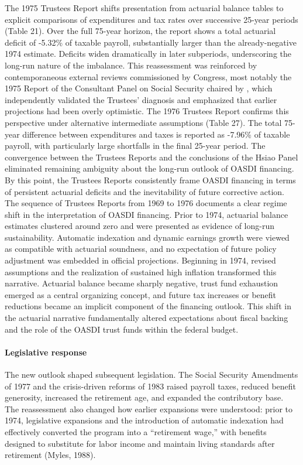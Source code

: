 \documentclass[12pt]{article}%
\theoremstyle{remark}
\begin{document}
The 1975 Trustees Report shifts presentation from actuarial balance tables to explicit comparisons of expenditures and tax rates over successive 25-year periods (Table 21). Over the full 75-year horizon, the report shows a total actuarial deficit of -5.32\% of taxable payroll, substantially larger than the already-negative 1974 estimate. Deficits widen dramatically in later subperiods, underscoring the long-run nature of the imbalance. This reassessment was reinforced by contemporaneous external reviews commissioned by Congress, most notably the 1975 Report of the Consultant Panel on Social Security chaired by \cite{Hsiao1975Report}, which independently validated the Trustees’ diagnosis and emphasized that earlier projections had been overly optimistic.
The 1976 Trustees Report confirms this perspective under alternative intermediate assumptions (Table 27). The total 75-year difference between expenditures and taxes is reported as -7.96\% of taxable payroll, with particularly large shortfalls in the final 25-year period. The convergence between the Trustees Reports and the conclusions of the Hsiao Panel eliminated remaining ambiguity about the long-run outlook of OASDI financing. By this point, the Trustees Reports consistently frame OASDI financing in terms of persistent actuarial deficits and the inevitability of future corrective action.
The sequence of Trustees Reports from 1969 to 1976 documents a clear regime shift in the interpretation of OASDI financing. Prior to 1974, actuarial balance estimates clustered around zero and were presented as evidence of long-run sustainability. Automatic indexation and dynamic earnings growth were viewed as compatible with actuarial soundness, and no expectation of future policy adjustment was embedded in official projections.
Beginning in 1974, revised assumptions and the realization of sustained high inflation transformed this narrative. Actuarial balance became sharply negative, trust fund exhaustion emerged as a central organizing concept, and future tax increases or benefit reductions became an implicit component of the financing outlook. This shift in the actuarial narrative fundamentally altered expectations about fiscal backing and the role of the OASDI trust funds within the federal budget.
\paragraph{Legislative response}
The new outlook shaped subsequent legislation. The Social Security Amendments of 1977 and the crisis-driven reforms of 1983 raised payroll taxes, reduced benefit generosity, increased the retirement age, and expanded the contributory base. The reassessment also changed how earlier expansions were understood: prior to 1974, legislative expansions and the introduction of automatic indexation had effectively converted the program into a “retirement wage,” with benefits designed to substitute for labor income and maintain living standards after retirement (Myles, 1988).
\end{document}
